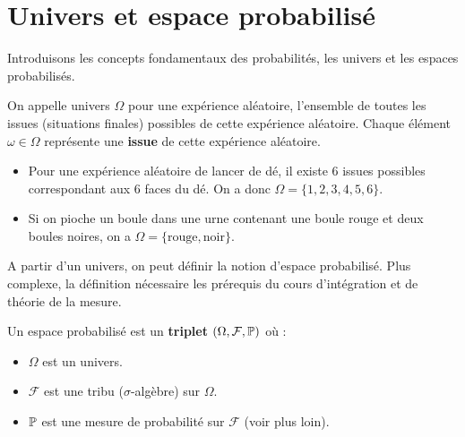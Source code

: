 
\minitoc  %





\section{Univers et espace probabilisé}

Introduisons les concepts fondamentaux des probabilités, les univers et les espaces probabilisés. 

\begin{definition}[Univers]
    On appelle univers $\Omega$ pour une expérience aléatoire, l'ensemble de toutes les issues (situations finales) possibles 
    de cette expérience aléatoire. Chaque élément $ \omega \in \Omega$ représente une \textbf{issue} de cette expérience aléatoire.  
\end{definition}

\begin{example}
    \begin{itemize}
        \item Pour une expérience aléatoire de lancer de dé, il existe 6 issues possibles correspondant aux 6 faces du dé. 
        On a donc $\Omega = \{1, 2, 3, 4, 5, 6\}$. 
        \item Si on pioche un boule dans une urne contenant une boule rouge et deux boules noires, on a 
        $ \Omega = \{\text{rouge}, \text{noir}\}$. 
    \end{itemize}
\end{example}

A partir d'un univers, on peut définir la notion d'espace probabilisé. Plus complexe, la définition nécessaire les prérequis 
du cours d'intégration et de théorie de la mesure. 

\begin{definition}
    Un espace probabilisé est un \textbf{triplet} $ (\Omega, \mathcal{F}, \mathbb{P})$ où :
    \begin{itemize}
        \item $\Omega$ est un univers. 
        \item $ \mathcal{F}$ est une tribu ($\sigma$-algèbre) sur $ \Omega$. 
        \item $ \mathbb{P}$ est une mesure de probabilité sur $ \mathcal{F}$ (voir plus loin). 
    \end{itemize}
\end{definition}

